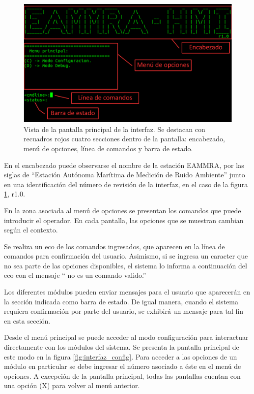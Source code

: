 \begin{figure}[htpb]
	\centering
	\includegraphics[width=\textwidth]{./Figures/interfaz_detalles.pdf}
	\caption[]{Vista de la pantalla principal de la interfaz. Se destacan con recuadros rojos cuatro secciones dentro de la pantalla: encabezado, menú de opciones, línea de comandos y barra de estado.}
	\label{fig:interfaz_main}
\end{figure}

En el encabezado puede observarse el nombre de la estación EAMMRA, por las siglas de ``Estación Autónoma Marítima de Medición de Ruido Ambiente'' junto en una identificación del número de revisión de la interfaz, en el caso de la figura \ref{fig:interfaz_main}, r1.0.

En la zona asociada al menú de opciones se presentan los comandos que puede introducir el operador. En cada pantalla, las opciones que se muestran cambian según el contexto.

Se realiza un eco de los comandos ingresados, que aparecen en la línea de comandos para confirmación del usuario. Asimismo, si se ingresa un caracter que no sea parte de las opciones disponibles, el sistema lo informa a continuación del eco con el mensaje `` no es un comando valido.''

Los diferentes módulos pueden enviar mensajes para el usuario que aparecerán en la sección indicada como barra de estado.  De igual manera, cuando el sistema requiera confirmación por parte del usuario, se exhibirá un mensaje para tal fin en esta sección.

Desde el menú principal se puede acceder al modo configuración para interactuar directamente con los módulos del sistema.  Se presenta la pantalla principal de este modo en la figura \ref{fig:interfaz_config}.  Para acceder a las opciones de un módulo en particular se debe ingresar el número asociado a éste en el menú de opciones.  A excepción de la pantalla principal, todas las pantallas cuentan con una opción (X) para volver al menú anterior.


